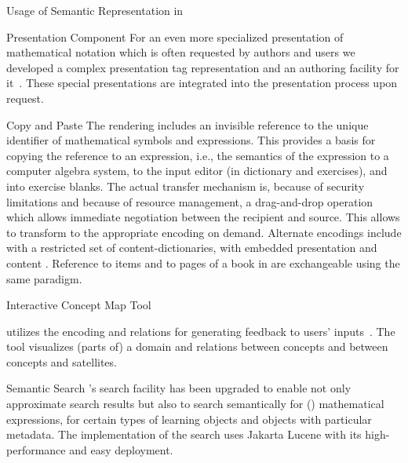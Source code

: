 \begin{omgroup}[id=activemath,short=ActiveMath,
  creators={melis,goguadse,alberto,frischauf,homik,libbrecht,cullrich}]
\begin{omgroup}{Usage of Semantic Representation in {\activemath}}
\begin{omgroup}{Presentation Component}
For an even more specialized presentation of mathematical notation which is often
requested by authors and users we developed a complex presentation tag representation and
an authoring facility for it~\cite{ManLib:apo05}. These special presentations are
integrated into the presentation process upon request.
\end{omgroup}

\begin{omgroup}{Copy and Paste}
The rendering includes an invisible reference to the unique identifier of mathematical
symbols and expressions. This provides a basis for copying the reference to an {\openmath}
expression, i.e., the semantics of the expression to a computer algebra system, to the
input editor (in dictionary and exercises), and into exercise blanks.
The actual transfer mechanism is, because of security limitations and
because of resource management, a drag-and-drop operation which allows
immediate negotiation between the recipient and source. This allows
to transform to the appropriate encoding on demand.
Alternate encodings include {\openmath} with a restricted set of content-dictionaries, 
{\html} with embedded presentation and content {\mathml}.
Reference to {\omdoc} items and to pages of a book in {\activemath} are
exchangeable using the same paradigm.
\end{omgroup}
\begin{omgroup}{Interactive Concept Map Tool {}}

{} utilizes the {\omdoc} encoding and relations for generating feedback to
users' inputs~\cite{MelisKaergerHomikcmapDelphi05}. The tool visualizes (parts of) a
domain and relations between concepts and between concepts and satellites.
\end{omgroup}

\begin{omgroup}{Semantic Search}
{\activemath}'s search facility has been upgraded to enable not only approximate search
results but also to search semantically for ({\openmath}) mathematical expressions, for
certain types of learning objects and objects with particular metadata.
The implementation of the search uses Jakarta Lucene with its high-performance
and easy deployment.
\end{omgroup}


\end{omgroup}
\end{omgroup}
